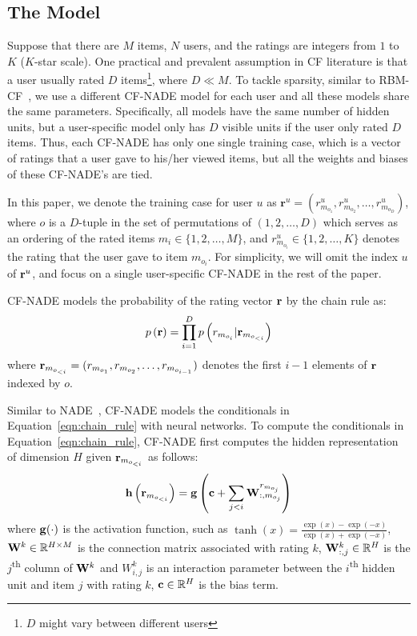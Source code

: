 \documentclass{article}
\newcommand{\cfnade}{CF-NADE\xspace}
\newcommand{\reals}{\mathbb{R}}
\begin{document}
\subsection{The Model} 
\label{sec:model}


Suppose that there are $M$ items, $N$ users, and the ratings are
integers from $1$ to $K$ ($K$-star scale). One practical and prevalent
assumption in CF literature is that a user usually rated $D$
items\footnote{$D$ might vary between different users}, where
$D \ll M$. To tackle sparsity, similar to
RBM-CF~\citep{salakhutdinov2007restricted}, we use a different \cfnade
model for each user and all these models share the same
parameters. Specifically, all models have the same number of hidden
units, but a user-specific model only has $D$ visible units if the user
only rated $D$ items. Thus, each \cfnade has only one single training
case, which is a vector of ratings that a user gave to his/her viewed
items, but all the weights and biases of these \cfnade 's are tied.

In this paper, we denote the training case for user $u$ as
$\mathbf{r}^{u} = (r^{u}_{m_{o_1}}, r^{u}_{m_{o_2}}, \ldots,
r^{u}_{m_{o_D}})$,
where $o$ is a $D$-tuple in the set of permutations of
$(1,2,\ldots,D)$ which serves as an ordering of the rated items
$m_i\in \{1,2,\ldots,M\}$, and $r^{u}_{m_{o_i}} \in \{1,2,\ldots,K\}$
denotes the rating that the user gave to item $m_{o_i}$. For
simplicity, we will omit the index $u$ of ${\bf r}^u$, and focus on a
single user-specific \cfnade in the rest of the paper.





\cfnade models the probability of the rating vector $\bf r$ by the chain rule as:
\begin{equation}
    p\left({\bf r}\right) = \prod_{i=1}^{D} p\left(r_{m_{o_i}}|{\bf r}_{m_{o_{<i}}}\right)
    \label{eqn:chain_rule}
\end{equation}
where ${\bf r}_{m_{o_{<i}}} = (r_{m_{o_1}}, r_{m_{o_2}}, \ldots, r_{m_{o_{i-1}}})$ denotes the first $i-1$ elements of $\bf r$ indexed by $o$.

Similar to NADE~\citep{larochelle2011neural}, \cfnade models the
conditionals in Equation~\ref{eqn:chain_rule} with neural networks. To
compute the conditionals in Equation~\ref{eqn:chain_rule}, \cfnade
first computes the hidden representation of dimension $H$ given
${\bf r}_{m_{o_{<i}}}$ as follows:
\begin{equation}
\mathbf{h}\left ( {\bf r}_{m_{o_{<i}}} \right ) = {\bf g}\left( \mathbf{c}+\sum_{j<i}\mathbf{W}^{r_{m_{o_j}}}_{:,m_{o_j}} \right ) 
\label{eqn:cfnade_hidden}
\end{equation}
where $\bf g(\cdot)$ is the activation function, such as $\tanh(x) =
\frac{\exp(x)-\exp(-x)}{\exp(x)+\exp(-x)}$, ${\bf W}^k\in \reals^{H\times M }$ is the connection
matrix associated with rating $k$, ${\bf W}_{:,j}^k\in \reals^{H}$ is the $j$\textsuperscript{th} column of  ${\bf W}^k$ and $W^{k}_{i,j}$ is an interaction
parameter between the $i$\textsuperscript{th} hidden unit and item
$j$ with rating $k$,  ${\bf c}\in \reals^H$ is the bias term.
\end{document}
